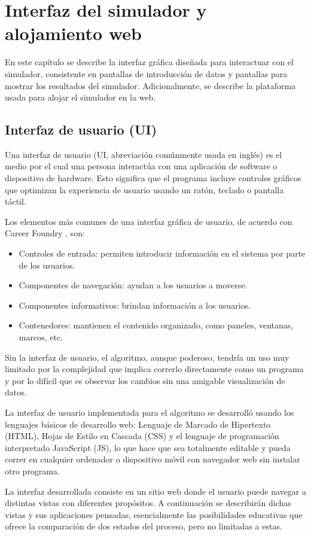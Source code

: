 \chapter{Interfaz del simulador y alojamiento web}
\par En este capítulo se describe la interfaz gráfica diseñada para interactuar con el simulador, consistente en pantallas de introducción de datos y pantallas para mostrar los resultados del simulador. Adicionalmente, se describe la plataforma usada para alojar el simulador en la web.

\section{Interfaz de usuario (UI)}
\par Una interfaz de usuario (UI, abreviación comúnmente usada en inglés) es el medio por el cual una persona interactúa con una aplicación de software o dispositivo de hardware. Esto significa que el programa incluye controles gráficos que optimizan la experiencia de usuario usando un ratón, teclado o pantalla táctil.
\par Los elementos más comunes de una interfaz gráfica de usuario, de acuerdo con Career Foundry \cite{ui}, son:
\begin{itemize}
\item Controles de entrada: permiten introducir información en el sistema por parte de los usuarios.
\item Componentes de navegación: ayudan a los usuarios a moverse.
\item Componentes informativos: brindan información a los usuarios.
\item Contenedores: mantienen el contenido organizado, como paneles, ventanas, marcos, etc.
\end{itemize}
\par Sin la interfaz de usuario, el algoritmo, aunque poderoso, tendría un uso muy limitado por la complejidad que implica correrlo directamente como un programa y por lo difícil que es observar los cambios sin una amigable visualización de datos.
\par La interfaz de usuario implementada para el algoritmo se desarrolló usando los lenguajes básicos de desarrollo web: Lenguaje de Marcado de Hipertexto (HTML), Hojas de Estilo en Cascada (CSS) y el lenguaje de programación interpretado JavaScript (JS), lo que hace que sea totalmente editable y pueda correr en cualquier ordenador o dispositivo móvil con navegador web sin instalar otro programa. 
\par La interfaz desarrollada consiste en un sitio web donde el usuario puede navegar a distintas vistas con diferentes propósitos. A continuación se describirán dichas vistas y sus aplicaciones pensadas, esencialmente las posibilidades educativas que ofrece la comparación de dos estados del proceso, pero no limitadas a estas.

